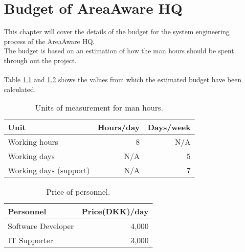 %
\thispagestyle{fancy}
\chapter{Budget of AreaAware HQ}
\label{chp:budget}

This chapter will cover the details of the budget for the system engineering process of the AreaAware HQ. \\
The budget is based on an estimation of how the man hours should be spent through out the project.\\\\
Table \ref{tb:units} and \ref{tb:price} shows the values from which the estimated budget have been calculated.
\begin{table}[ht]
    \centering
    \begin{tabular}{|l|r|r|}
        \hline
        \textbf{Unit} & \textbf{Hours/day} & \textbf{Days/week} \\
        \hline
        Working hours & 8 & N/A \\
        Working days & N/A & 5 \\
        Working days (support) & N/A & 7 \\
        \hline
    \end{tabular}
    \caption{Units of measurement for man hours.}
    \label{tb:units} 
\end{table}

\begin{table}[ht]
    \centering
    \begin{tabular}{|l|r|}
        \hline
        \textbf{Personnel} & \textbf{Price(DKK)/day} \\
        \hline
        Software Developer & 4,000  \\
        IT Supporter & 3,000 \\
        \hline
    \end{tabular}
    \caption{Price of personnel.}
    \label{tb:price} 
\end{table}

